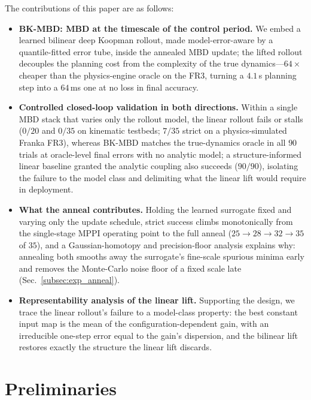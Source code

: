 \documentclass[lettersize,journal]{IEEEtran}
\theoremstyle{remark}
\newcommand{\bkmbd}{\textsc{BK-MBD}}
\begin{document}
The contributions of this paper are as follows:
\begin{itemize}
\item \textbf{\bkmbd{}: MBD at the timescale of the control period.} We
embed a learned bilinear deep Koopman rollout, made model-error-aware by
a quantile-fitted error tube, inside the annealed MBD update; the lifted
rollout decouples the planning cost from the complexity of the true
dynamics---$64\times$ cheaper than the physics-engine oracle on the FR3,
turning a $4.1$\,s planning step into a $64$\,ms one at no loss in
final accuracy.
\item \textbf{Controlled closed-loop validation in both directions.}
Within a single MBD stack that varies only the rollout model, the linear
rollout fails or stalls ($0/20$ and $0/35$ on kinematic testbeds; $7/35$
strict on a physics-simulated Franka FR3), whereas \bkmbd{} matches the
true-dynamics oracle in all $90$ trials at oracle-level final errors with
no analytic model; a structure-informed linear baseline granted the
analytic coupling also succeeds ($90/90$), isolating the failure to the
model class and delimiting what the linear lift would require in
deployment.
\item \textbf{What the anneal contributes.} Holding the learned surrogate
fixed and varying only the update schedule, strict success climbs
monotonically from the single-stage MPPI operating point to the full
anneal ($25 \to 28 \to 32 \to 35$ of $35$), and a Gaussian-homotopy and
precision-floor analysis explains why: annealing both smooths away the
surrogate's fine-scale spurious minima early and removes the
Monte-Carlo noise floor of a fixed scale late
(Sec.~\ref{subsec:exp_anneal}).
\item \textbf{Representability analysis of the linear lift.} Supporting
the design, we trace the linear rollout's failure to a model-class
property: the best constant input map is the mean of the
configuration-dependent gain, with an irreducible one-step error equal
to the gain's dispersion, and the bilinear lift restores exactly the
structure the linear lift discards.
\end{itemize}

\section{Preliminaries}\label{sec:prelim}
\end{document}
